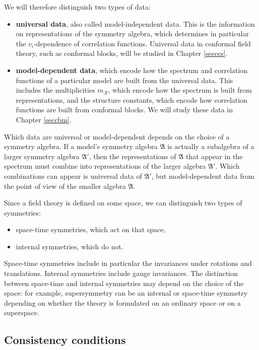\documentclass[12pt, a4paper, notitlepage, twoside]{report}
\numberwithin{equation}{section}
\theoremstyle{break}
\begin{document}
We will therefore distinguish two types of data:
\begin{itemize}
 \item \textbf{\boldmath universal data}, also called 
model-independent data.
This is the information on representations of the symmetry algebra, which determines in particular the $v_i$-dependence of correlation functions.
Universal data in conformal field theory, such as conformal blocks, will be studied in Chapter \ref{secccs}. 
\item \textbf{\boldmath model-dependent data}, which encode how the spectrum and correlation functions of a particular model are built from the universal data.
This includes the multiplicities $m_\mathcal{R}$, which encode how the spectrum is built from representations, and the structure constants, which encode how correlation functions are built from conformal blocks.
We will study these data 
in Chapter \ref{seccbm}.  
\end{itemize}
Which data are  universal or model-dependent depends on the choice of a symmetry algebra.
If a model's symmetry algebra $\mathfrak{A}$ is actually a subalgebra of a larger symmetry algebra $\mathfrak{A}'$, then the representations of $\mathfrak{A}$ that appear in the spectrum
must combine into representations of the larger algebra $\mathfrak{A}'$.
Which combinations can appear is universal data of $\mathfrak{A}'$, but model-dependent data from the point of view of the smaller algebra $\mathfrak{A}$. 

Since a field theory is defined on some space, we can distinguish two types of symmetries: 
\begin{itemize}
 \item space-time symmetries, which act on that space,
\item internal symmetries, which do not.
\end{itemize}
Space-time symmetries include in particular the invariances under rotations and translations.
Internal symmetries include gauge invariances.
The distinction between space-time and internal symmetries may depend on the choice of the space: for example, supersymmetry can be an internal or space-time symmetry depending on whether the theory is formulated on an ordinary space or on a superspace.

\subsection{Consistency conditions \label{seccc}}
\end{document}
